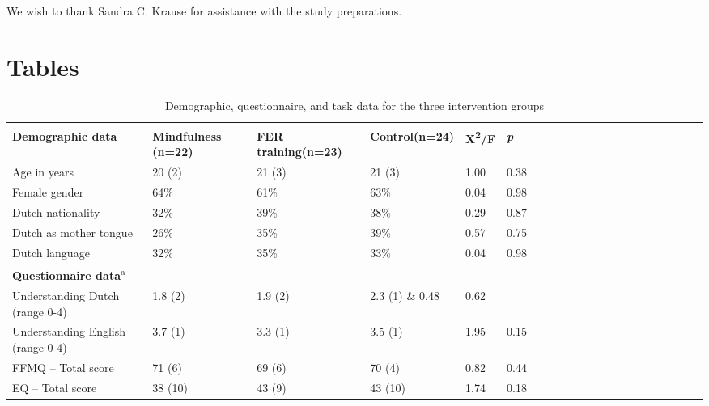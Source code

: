 \documentclass[authordate, empirical]{jote-new-article}
\begin{document}
	We wish to thank Sandra C. Krause for assistance with the study preparations.


\printbibliography
\onecolumn

\section{Tables}



\begin{table}[h!]
    \begin{fullwidth}
    \caption{Demographic, questionnaire, and task data for the three intervention groups}
    \begin{tabularx}{\linewidth}{@{} l l l l l l l l l l l l l l l l l l l l l  @{}}
         \multicolumn{6}{l}{}
        \\

        \textbf{Demographic data} & \textbf{Mindfulness (n=22)} & \textbf{FER training(n=23)}
        & \textbf{Control(n=24)} & \textbf{X\textsuperscript{2}/F} & \textbf{\emph{p}} \\

         Age in years & 20 (2) & 21 (3) & 21 (3) & 1.00 & 0.38 \\

         Female gender & 64\% & 61\% & 63\% & 0.04 & 0.98 \\

         Dutch nationality & 32\% & 39\% & 38\% & 0.29 & 0.87 \\

         Dutch as mother tongue & 26\% & 35\% & 39\% & 0.57 & 0.75 \\

         Dutch language & 32\% & 35\% & 33\% & 0.04 & 0.98 \\

         \textbf{Questionnaire data}\textsuperscript{a} \\

         Understanding Dutch (range 0-4) & 1.8 (2) & 1.9 (2) & 2.3 (1) \& 0.48 & 0.62
        \\

         Understanding English (range 0-4) & 3.7 (1) & 3.3 (1) & 3.5 (1) & 1.95 & 0.15
        \\

         FFMQ – Total score & 71 (6) & 69 (6) & 70 (4) & 0.82 & 0.44 \\

         EQ – Total score & 38 (10)  & 43 (9) & 43 (10) & 1.74 & 0.18 \\


\end{tabularx}
\end{fullwidth}
\end{table}
\end{document}
